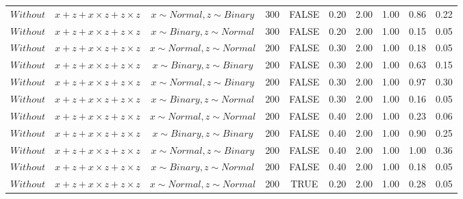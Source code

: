 \begin{longtable}{lccccccccc}
  $Without$ & $\textit{x} + \textit{z} + \textit{x} \times \textit{z} + \textit{z} \times \textit{z}$ & $\textit{x} \sim Normal, \textit{z} \sim Binary$ & 300 & FALSE & 0.20 & 2.00 & 1.00 & 0.86 & 0.22 \\ 
  $Without$ & $\textit{x} + \textit{z} + \textit{x} \times \textit{z} + \textit{z} \times \textit{z}$ & $\textit{x} \sim Binary, \textit{z} \sim Normal$ & 300 & FALSE & 0.20 & 2.00 & 1.00 & 0.15 & 0.05 \\ 
  $Without$ & $\textit{x} + \textit{z} + \textit{x} \times \textit{z} + \textit{z} \times \textit{z}$ & $\textit{x} \sim Normal , \textit{z} \sim Normal$ & 200 & FALSE & 0.30 & 2.00 & 1.00 & 0.18 & 0.05 \\ 
  $Without$ & $\textit{x} + \textit{z} + \textit{x} \times \textit{z} + \textit{z} \times \textit{z}$ & $\textit{x} \sim Binary, \textit{z} \sim Binary$ & 200 & FALSE & 0.30 & 2.00 & 1.00 & 0.63 & 0.15 \\ 
  $Without$ & $\textit{x} + \textit{z} + \textit{x} \times \textit{z} + \textit{z} \times \textit{z}$ & $\textit{x} \sim Normal, \textit{z} \sim Binary$ & 200 & FALSE & 0.30 & 2.00 & 1.00 & 0.97 & 0.30 \\ 
  $Without$ & $\textit{x} + \textit{z} + \textit{x} \times \textit{z} + \textit{z} \times \textit{z}$ & $\textit{x} \sim Binary, \textit{z} \sim Normal$ & 200 & FALSE & 0.30 & 2.00 & 1.00 & 0.16 & 0.05 \\ 
  $Without$ & $\textit{x} + \textit{z} + \textit{x} \times \textit{z} + \textit{z} \times \textit{z}$ & $\textit{x} \sim Normal , \textit{z} \sim Normal$ & 200 & FALSE & 0.40 & 2.00 & 1.00 & 0.23 & 0.06 \\ 
  $Without$ & $\textit{x} + \textit{z} + \textit{x} \times \textit{z} + \textit{z} \times \textit{z}$ & $\textit{x} \sim Binary, \textit{z} \sim Binary$ & 200 & FALSE & 0.40 & 2.00 & 1.00 & 0.90 & 0.25 \\ 
  $Without$ & $\textit{x} + \textit{z} + \textit{x} \times \textit{z} + \textit{z} \times \textit{z}$ & $\textit{x} \sim Normal, \textit{z} \sim Binary$ & 200 & FALSE & 0.40 & 2.00 & 1.00 & 1.00 & 0.36 \\ 
  $Without$ & $\textit{x} + \textit{z} + \textit{x} \times \textit{z} + \textit{z} \times \textit{z}$ & $\textit{x} \sim Binary, \textit{z} \sim Normal$ & 200 & FALSE & 0.40 & 2.00 & 1.00 & 0.18 & 0.05 \\ 
  $Without$ & $\textit{x} + \textit{z} + \textit{x} \times \textit{z} + \textit{z} \times \textit{z}$ & $\textit{x} \sim Normal , \textit{z} \sim Normal$ & 200 & TRUE & 0.20 & 2.00 & 1.00 & 0.28 & 0.05 \\ 

\end{longtable}
